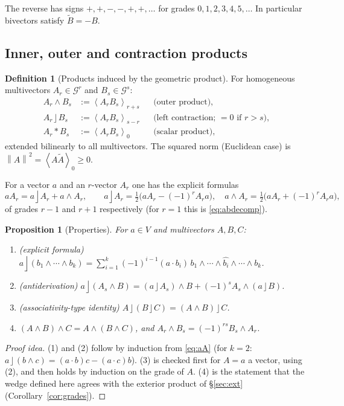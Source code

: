 \documentclass[11pt,a4paper]{article}
\newcounter{thm}[section]
\numberwithin{equation}{section}
\theoremstyle{definition}
\newtheorem{definition}[thm]{Definition}
\theoremstyle{plain}
\newtheorem{proposition}[thm]{Proposition}
\newcommand{\GA}{\mathcal{G}}
\newcommand{\gr}[2]{\left\langle #1 \right\rangle_{#2}}
\newcommand{\rev}[1]{\widetilde{#1}}
\newcommand{\lc}{\mathbin{\rfloor}}
\newcommand{\norm}[1]{\left\lVert #1\right\rVert}
\begin{document}
The reverse has signs $+,+,-,-,+,+,\dots$ for grades $0,1,2,3,4,5,\dots$ In particular bivectors satisfy $\rev B=-B$.

\subsection{Inner, outer and contraction products}

\begin{definition}[Products induced by the geometric product]\label{def:products}
For homogeneous multivectors $A_r\in\GA^r$ and $B_s\in\GA^s$:
\begin{align*}
 A_r\wedge B_s&:=\gr{A_rB_s}{r+s}&&\text{(outer product)},\\
 A_r\lc B_s&:=\gr{A_rB_s}{s-r}&&\text{(left contraction; $=0$ if $r>s$)},\\
 A_r*B_s&:=\gr{A_rB_s}{0}&&\text{(scalar product)},
\end{align*}
extended bilinearly to all multivectors. The squared norm (Euclidean case) is $\norm A^2=\gr{A\rev A}{0}\ge0$.
\end{definition}

For a vector $a$ and an $r$-vector $A_r$ one has the explicit formulas
\begin{equation}\label{eq:aA}
 aA_r=a\lc A_r+a\wedge A_r,\qquad
 a\lc A_r=\tfrac12\bigl(aA_r-(-1)^rA_ra\bigr),\quad
 a\wedge A_r=\tfrac12\bigl(aA_r+(-1)^rA_ra\bigr),
\end{equation}
of grades $r-1$ and $r+1$ respectively (for $r=1$ this is \eqref{eq:abdecomp}).

\begin{proposition}[Properties]\label{prop:contr}
For $a\in V$ and multivectors $A,B,C$:
\begin{enumerate}
  \item (explicit formula) $a\lc(b_1\wedge\cdots\wedge b_k)=\sum_{i=1}^k(-1)^{i-1}(a\cdot b_i)\,b_1\wedge\cdots\wedge\widehat{b_i}\wedge\cdots\wedge b_k$.
  \item (antiderivation) $a\lc(A_s\wedge B)=(a\lc A_s)\wedge B+(-1)^sA_s\wedge(a\lc B)$.
  \item (associativity-type identity) $A\lc(B\lc C)=(A\wedge B)\lc C$.
  \item $(A\wedge B)\wedge C=A\wedge(B\wedge C)$, and $A_r\wedge B_s=(-1)^{rs}B_s\wedge A_r$.
\end{enumerate}
\end{proposition}
\begin{proof}[Proof idea]
(1) and (2) follow by induction from \eqref{eq:aA} (for $k=2$: $a\lc(b\wedge c)=(a\cdot b)c-(a\cdot c)b$). (3) is checked first for $A=a$ a vector, using (2), and then holds by induction on the grade of $A$. (4) is the statement that the wedge defined here agrees with the exterior product of \S\ref{sec:ext} (Corollary~\ref{cor:grades}).
\end{proof}
\end{document}
